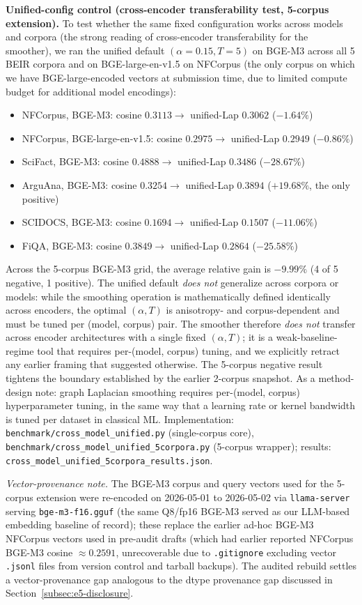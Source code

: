 \documentclass[review,1p]{elsarticle}
\begin{document}
\textbf{Unified-config control (cross-encoder transferability test, 5-corpus extension).} To test whether the same fixed configuration works across models and corpora (the strong reading of cross-encoder transferability for the smoother), we ran the unified default $(\alpha = 0.15, T = 5)$ on BGE-M3 across all 5 BEIR corpora and on BGE-large-en-v1.5 on NFCorpus (the only corpus on which we have BGE-large-encoded vectors at submission time, due to limited compute budget for additional model encodings):
\begin{itemize}
\item NFCorpus, BGE-M3: cosine $0.3113 \to$ unified-Lap $0.3062$ ($-1.64\%$)
\item NFCorpus, BGE-large-en-v1.5: cosine $0.2975 \to$ unified-Lap $0.2949$ ($-0.86\%$)
\item SciFact, BGE-M3: cosine $0.4888 \to$ unified-Lap $0.3486$ ($-28.67\%$)
\item ArguAna, BGE-M3: cosine $0.3254 \to$ unified-Lap $0.3894$ ($\mathbf{+19.68\%}$, the only positive)
\item SCIDOCS, BGE-M3: cosine $0.1694 \to$ unified-Lap $0.1507$ ($-11.06\%$)
\item FiQA, BGE-M3: cosine $0.3849 \to$ unified-Lap $0.2864$ ($-25.58\%$)
\end{itemize}
Across the 5-corpus BGE-M3 grid, the average relative gain is $-9.99\%$ (4 of 5 negative, 1 positive). The unified default \emph{does not} generalize across corpora or models: while the smoothing operation is mathematically defined identically across encoders, the optimal $(\alpha, T)$ is anisotropy- and corpus-dependent and must be tuned per (model, corpus) pair. The smoother therefore \emph{does not} transfer across encoder architectures with a single fixed $(\alpha, T)$; it is a weak-baseline-regime tool that requires per-(model, corpus) tuning, and we explicitly retract any earlier framing that suggested otherwise. The 5-corpus negative result tightens the boundary established by the earlier 2-corpus snapshot. As a method-design note: graph Laplacian smoothing requires per-(model, corpus) hyperparameter tuning, in the same way that a learning rate or kernel bandwidth is tuned per dataset in classical ML. Implementation: \texttt{benchmark/cross\_model\_unified.py} (single-corpus core), \texttt{benchmark/cross\_model\_unified\_5corpora.py} (5-corpus wrapper); results: \texttt{cross\_model\_unified\_5corpora\_results.json}.

\textit{Vector-provenance note.} The BGE-M3 corpus and query vectors used for the 5-corpus extension were re-encoded on 2026-05-01 to 2026-05-02 via \texttt{llama-server} serving \texttt{bge-m3-f16.gguf} (the same Q8/fp16 BGE-M3 served as our LLM-based embedding baseline of record); these replace the earlier ad-hoc BGE-M3 NFCorpus vectors used in pre-audit drafts (which had earlier reported NFCorpus BGE-M3 cosine $\approx 0.2591$, unrecoverable due to \texttt{.gitignore} excluding vector \texttt{.jsonl} files from version control and tarball backups). The audited rebuild settles a vector-provenance gap analogous to the dtype provenance gap discussed in Section~\ref{subsec:e5-disclosure}.
\end{document}
